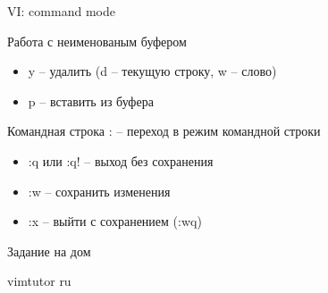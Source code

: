 \begin{frame}{VI: command mode}

	\begin{block}{Работа с неименованым буфером}
		\begin{itemize}
			\item y -- удалить (d -- текущую строку, w -- слово)
			\item p -- вставить из буфера
		\end{itemize}
	\end{block}

	\begin{block}{Командная строка}
		: -- переход в режим командной строки
		\begin{itemize}
			\item :q или :q! -- выход без сохранения
			\item :w -- сохранить изменения
			\item :x -- выйти с сохранением (:wq)
		\end{itemize}
	\end{block}
\end{frame}

\begin{frame}{Задание на дом}
\begin{block}{}
vimtutor ru
\end{block}
\end{frame}


